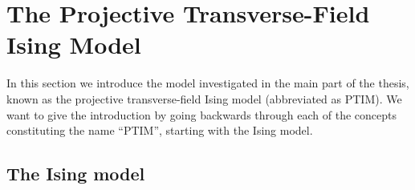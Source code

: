 \clearpage
\section{The Projective Transverse-Field Ising Model}\label{sec:intro-ptim}

In this section we introduce the model investigated in the main part of the
thesis, known as the projective transverse-field Ising model (abbreviated as
PTIM). 
We want to give the introduction by going backwards through each of the
concepts constituting the name \enquote{PTIM}, starting with the Ising model.

\subsection{The Ising model}


